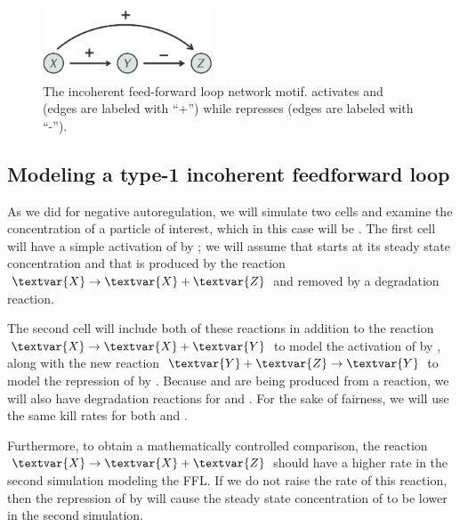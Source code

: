 \begin{figure}[h]
\centering
\mySfFamily
\includegraphics[width = 0.45\textwidth]{../images_CMYK/type-1_incoherent_feed-forward_loop}
\caption{The incoherent feed-forward loop network motif.  activates  and  (edges are labeled with ``+'') while  represses  (edges are labeled with ``-'').}
\label{fig:type-1_incoherent_feed-forward_loop}
\end{figure}

\begin{qbox}\end{qbox}

\FloatBarrier
{}
\subsection{Modeling a type-1 incoherent feedforward loop}

As we did for negative autoregulation, we will simulate two cells and examine the concentration of a particle of interest, which in this case will be . The first cell will have a simple activation of  by ; we will assume that  starts at its steady state concentration and that  is produced by the reaction $\textvar{X} \rightarrow \textvar{X} + \textvar{Z}$ and removed by a degradation reaction.

The second cell will include both of these reactions in addition to the reaction $\textvar{X} \rightarrow \textvar{X} + \textvar{Y}$ to model the activation of  by , along with the new reaction $\textvar{Y} + \textvar{Z} \rightarrow \textvar{Y}$ to model the repression of  by . Because  and  are being produced from a reaction, we will also have degradation reactions for  and . For the sake of fairness, we will use the same kill rates for both  and .

Furthermore, to obtain a mathematically controlled comparison, the reaction $\textvar{X} \rightarrow \textvar{X} + \textvar{Z}$ should have a higher rate in the second simulation modeling the FFL. If we do not raise the rate of this reaction, then the repression of  by  will cause the steady state concentration of  to be lower in the second simulation.

